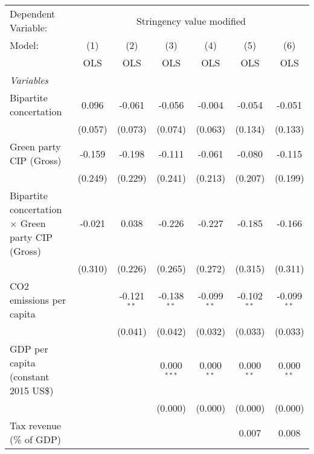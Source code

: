 
\begingroup
\centering
\begin{tabular}{lcccccc}
   \toprule
   Dependent Variable: & \multicolumn{6}{c}{Stringency value modified}\\
   Model:                                                   & (1)     & (2)           & (3)           & (4)           & (5)           & (6)\\  
                                                            &  OLS    & OLS           & OLS           & OLS           & OLS           & OLS\\  
   \midrule
   \emph{Variables}\\
   Bipartite concertation                                   & 0.096   & -0.061        & -0.056        & -0.004        & -0.054        & -0.051\\   
                                                            & (0.057) & (0.073)       & (0.074)       & (0.063)       & (0.134)       & (0.133)\\   
   Green party CIP (Gross)                                  & -0.159  & -0.198        & -0.111        & -0.061        & -0.080        & -0.115\\   
                                                            & (0.249) & (0.229)       & (0.241)       & (0.213)       & (0.207)       & (0.199)\\   
   Bipartite concertation $\times$ Green party CIP (Gross)  & -0.021  & 0.038         & -0.226        & -0.227        & -0.185        & -0.166\\   
                                                            & (0.310) & (0.226)       & (0.265)       & (0.272)       & (0.315)       & (0.311)\\   
   CO2 emissions per capita                                 &         & -0.121$^{**}$ & -0.138$^{**}$ & -0.099$^{**}$ & -0.102$^{**}$ & -0.099$^{**}$\\   
                                                            &         & (0.041)       & (0.042)       & (0.032)       & (0.033)       & (0.033)\\   
   GDP per capita (constant 2015 US\$)                      &         &               & 0.000$^{***}$ & 0.000$^{**}$  & 0.000$^{**}$  & 0.000$^{**}$\\   
                                                            &         &               & (0.000)       & (0.000)       & (0.000)       & (0.000)\\   
   Tax revenue (\% of GDP)                                  &         &               &               &               & 0.007         & 0.008\\   

\end{tabular}
